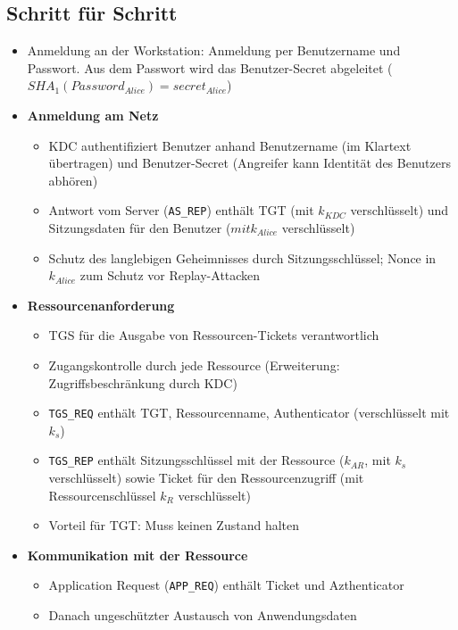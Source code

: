 \subsection{Schritt für Schritt}
\begin{itemize}
	\item Anmeldung an der Workstation: Anmeldung per Benutzername und Passwort. Aus dem Passwort wird das Benutzer-Secret abgeleitet (\(SHA_1(Password_{Alice}) = secret_{Alice}\))
	\item \textbf{Anmeldung am Netz}
	\begin{itemize}
		\item KDC authentifiziert Benutzer anhand Benutzername (im Klartext übertragen) und Benutzer-Secret (Angreifer kann Identität des Benutzers abhören)
		\item Antwort vom Server (\texttt{AS\_REP}) enthält TGT (mit \(k_{KDC}\) verschlüsselt) und Sitzungsdaten für den Benutzer (\(mit k_{Alice}\) verschlüsselt)
		\item Schutz des langlebigen Geheimnisses durch Sitzungsschlüssel; Nonce in \(k_{Alice}\) zum Schutz vor Replay-Attacken
	\end{itemize}
	\item \textbf{Ressourcenanforderung}
	\begin{itemize}
		\item TGS für die Ausgabe von Ressourcen-Tickets verantwortlich
		\item Zugangskontrolle durch jede Ressource (Erweiterung: Zugriffsbeschränkung durch KDC)
		\item \texttt{TGS\_REQ} enthält TGT, Ressourcenname, Authenticator (verschlüsselt mit \(k_s\))
		\item \texttt{TGS\_REP} enthält Sitzungsschlüssel mit der Ressource (\(k_{AR}\), mit \(k_s\) verschlüsselt) sowie Ticket für den Ressourcenzugriff (mit Ressourcenschlüssel \(k_R\) verschlüsselt)
		\item Vorteil für TGT: Muss keinen Zustand halten
	\end{itemize}
	\item \textbf{Kommunikation mit der Ressource}
	\begin{itemize}
		\item Application Request (\texttt{APP\_REQ}) enthält Ticket und Azthenticator
		\item Danach ungeschützter Austausch von Anwendungsdaten
	\end{itemize}
\end{itemize}


